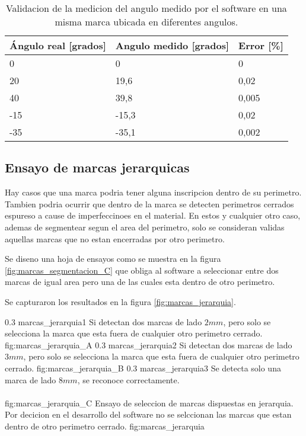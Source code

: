       \begin{table}[!ht]
         \centering
         \caption[Ensayo de medicion de angulos de marcas]{Validacion de la medicion del angulo medido por el software en una misma marca ubicada en diferentes angulos.}
         \begin{tabular}[!ht]{m{1.6cm}m{1.6cm}m{1.6cm}}
            \toprule
            \textbf{Ángulo real [grados]} & \textbf{Angulo medido [grados]} & \textbf{Error [\%]}\\
            \midrule
            {0}   & {0}     & {0}\\
            {20}  & {19,6}  & {0,02}\\
            {40}  & {39,8}  & {0,005}\\
            {-15} & {-15,3} & {0,02}\\
            {-35} & {-35,1} & {0,002}\\
            \bottomrule
         \end{tabular}
         \label{tbl:marcas_angulos}
      \end{table}

\subsection{Ensayo de marcas jerarquicas}

Hay casos que una marca podria tener alguna inscripcion dentro de su perimetro. Tambien podria ocurrir que dentro de la marca se detecten perimetros cerrados espureso a cause de imperfeccinoes en el material. En estos y cualquier otro caso, ademas de segmentear segun el area del perimetro, solo se consideran validas aquellas marcas que no estan encerradas por otro perimetro. \par
Se diseno una hoja de ensayos como se muestra en la figura \ref{fig:marcas_segmentacion_C} que obliga al software a seleccionar entre dos marcas de igual area pero una de las cuales esta dentro de otro perimetro.\par
   Se capturaron los resultados en la figura \ref{fig:marcas_jerarquia}.

   \subfigabc
   {0.3} {marcas_jerarquia1} {Si detectan dos marcas de lado $2mm$, pero solo se selecciona la marca que esta fuera de cualquier otro perimetro cerrado.} {fig:marcas_jerarquia_A}
   {0.3} {marcas_jerarquia2} {Si detectan dos marcas de lado $3mm$, pero solo se selecciona la marca que esta fuera de cualquier otro perimetro cerrado.} {fig:marcas_jerarquia_B}
   {0.3} {marcas_jerarquia3} {Se detecta solo una marca de lado $8mm$, se reconoce correctamente.\\ \vphantom{1}\\ \vphantom{1}} {fig:marcas_jerarquia_C}
   {Ensayo de seleccion de marcas dispuestas en jerarquia. Por decicion en el desarrollo del software no se selccionan las marcas que estan dentro de otro perimetro cerrado.}
   {fig:marcas_jerarquia}


